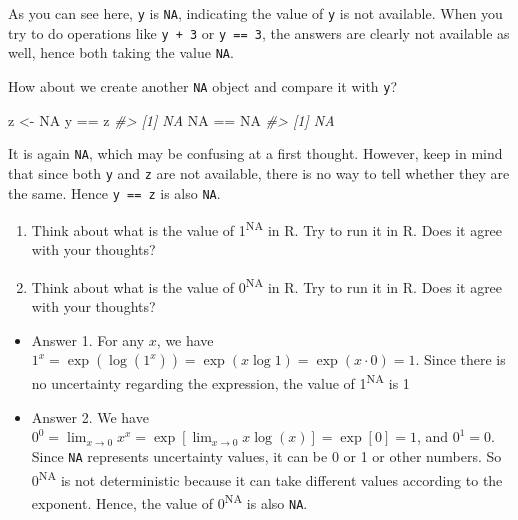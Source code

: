 \documentclass[
]{book}
\newenvironment{Shaded}{\begin{snugshade}}{\end{snugshade}}
\newcommand{\CommentTok}[1]{\textcolor[rgb]{0.56,0.35,0.01}{\textit{#1}}}
\newcommand{\ConstantTok}[1]{\textcolor[rgb]{0.00,0.00,0.00}{#1}}
\newcommand{\NormalTok}[1]{#1}
\newcommand{\OtherTok}[1]{\textcolor[rgb]{0.56,0.35,0.01}{#1}}
\newcommand{\SpecialCharTok}[1]{\textcolor[rgb]{0.00,0.00,0.00}{#1}}
\providecommand{\tightlist}{%
  \setlength{\itemsep}{0pt}\setlength{\parskip}{0pt}}
\newenvironment{blackbox}{
  \definecolor{shadecolor}{rgb}{0, 0, 0}  %
  \color{white}
  \begin{shaded}}
 {\end{shaded}}
\newenvironment{infobox}[1]
  {
  \begin{itemize}
  \renewcommand{\labelitemi}{
    \raisebox{-.7\height}[0pt][0pt]{
      {\setkeys{Gin}{width=3em,keepaspectratio}
        \texttt{[image: pics/\#1]}}
    }
  }
  \setlength{\fboxsep}{1em}
  \begin{blackbox}
  \item
  }
  {
  \end{blackbox}
  \end{itemize}
  }
\begin{document}
As you can see here, \texttt{y} is \texttt{NA}, indicating the value of \texttt{y} is not available. When you try to do operations like \texttt{y\ +\ 3} or \texttt{y\ ==\ 3}, the answers are clearly not available as well, hence both taking the value \texttt{NA}.

How about we create another \texttt{NA} object and compare it with \texttt{y}?

\begin{Shaded}
\begin{Highlighting}[]
\NormalTok{z }\OtherTok{\textless{}{-}} \ConstantTok{NA} 
\NormalTok{y }\SpecialCharTok{==}\NormalTok{ z }
\CommentTok{\#\textgreater{} [1] NA}
\ConstantTok{NA} \SpecialCharTok{==} \ConstantTok{NA}
\CommentTok{\#\textgreater{} [1] NA}
\end{Highlighting}
\end{Shaded}

It is again \texttt{NA}, which may be confusing at a first thought. However, keep in mind that since both \texttt{y} and \texttt{z} are not available, there is no way to tell whether they are the same. Hence \texttt{y\ ==\ z} is also \texttt{NA}.

\begin{infobox}{caution}

\begin{enumerate}
\def\labelenumi{\arabic{enumi}.}
\item
  Think about what is the value of 1\textsuperscript{NA} in R. Try to run it in R. Does it agree with your thoughts?
\item
  Think about what is the value of 0\textsuperscript{NA} in R. Try to run it in R. Does it agree with your thoughts?
\end{enumerate}

\begin{itemize}
\tightlist
\item
  Answer 1. For any \(x\), we have \(1^x = \exp(\log (1^x)) = \exp(x \log 1) = \exp(x \cdot 0) = 1\). Since there is no uncertainty regarding the expression, the value of 1\textsuperscript{NA} is 1
\item
  Answer 2. We have \(0^0 = \lim_{x\to 0}x^x =\exp[\lim_{x\to 0} x\log(x)]=\exp[0] = 1\), and \(0^1 = 0\). Since \texttt{NA} represents uncertainty values, it can be 0 or 1 or other numbers. So 0\textsuperscript{NA} is not deterministic because it can take different values according to the exponent. Hence, the value of 0\textsuperscript{NA} is also \texttt{NA}.
\end{itemize}

\end{infobox}
\end{document}
